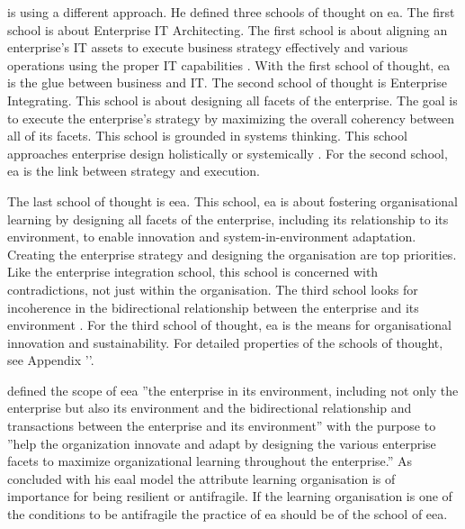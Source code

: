 \textcite{Lapalme2012} is using a different approach. He defined three schools of thought on \acrshort{ea}. The first school is about Enterprise IT Architecting. The first school is about aligning an enterprise's IT assets to execute business strategy effectively and various operations using the proper IT capabilities  \parencite[p. 38]{Lapalme2012}. With the first school of thought, \acrshort{ea} is the glue between business and IT. The second school of thought is Enterprise Integrating. This school is about designing all facets of the enterprise. The goal is to execute the enterprise's strategy by maximizing the overall coherency between all of its facets. This school is grounded in systems thinking. This school approaches enterprise design holistically or systemically \parencite[p. 40]{Lapalme2012}. For the second school, \acrshort{ea} is the link between strategy and execution. 

The last school of thought is \acrfull{eea}. This school, \acrshort{ea} is about fostering organisational learning by designing all facets of the enterprise, including its relationship to its environment, to enable innovation and system-in-environment adaptation. Creating the enterprise strategy and designing the organisation are top priorities. Like the enterprise integration school, this school is concerned with contradictions, not just within the organisation. The third school looks for incoherence in the bidirectional relationship between the enterprise and its environment \parencite[p. 40-41]{Lapalme2012}. For the third school of thought, \acrshort{ea} is the means for organisational innovation and sustainability. For detailed properties of the schools of thought, see Appendix ''.

\textcite{Lapalme2012} defined the scope of \acrshort{eea} ''the enterprise in its environment, including not only the enterprise but also its environment and the bidirectional relationship and transactions between the enterprise and its environment'' with the purpose to ''help the organization innovate and adapt by designing the various enterprise facets to maximize organizational learning throughout the enterprise.'' As \textcite{Botjes2020} concluded with his \acrshort{eaal} model the attribute learning organisation is of importance for being \gls{resilient} or \gls{antifragile}. If the learning organisation is one of the conditions to be \gls{antifragile} the practice of \acrshort{ea} should be of the school of \acrshort{eea}. 



